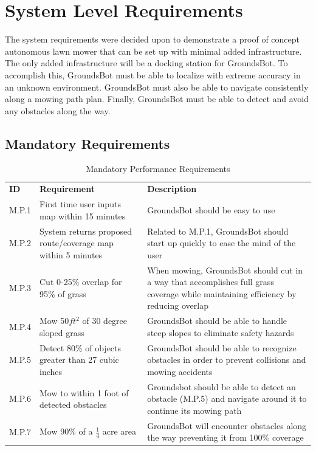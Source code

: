 \documentclass[12pt]{extarticle}
\begin{document}
\newpage
\section{System Level Requirements}

The system requirements were decided upon to demonstrate a proof of concept autonomous lawn mower that can be set up with minimal added infrastructure. The only added infrastructure will be a docking station for GroundsBot. To accomplish this, GroundsBot must be able to localize with extreme accuracy in an unknown environment. GroundsBot must also be able to navigate consistently along a mowing path plan. Finally, GroundsBot must be able to detect and avoid any obstacles along the way.

\subsection{Mandatory Requirements}
\begin{center}
  \begin{table}[H]
  \caption{Mandatory Performance Requirements}
  \label{table:mandatory performance}
  
  \vspace{1em}

  \def\arraystretch{1.5}
  	\begin{tabularx}{\textwidth}{ lXX }
  	  	\hline
		\sffamily\textbf{ID} & \sffamily\textbf{Requirement} & \sffamily\textbf{Description} \\
    	M.P.1 &
    	First time user inputs map within 15 minutes &
    	GroundsBot should be easy to use \\
   		M.P.2 &
   		System returns proposed route/coverage map within 5 minutes &
   		Related to M.P.1, GroundsBot should start up quickly to ease the mind of the user \\
   		M.P.3 &
   		Cut 0-25\% overlap for 95\% of grass &
   		When mowing, GroundsBot should cut in a way that accomplishes full grass coverage while maintaining efficiency by reducing overlap\\
		M.P.4 &
		Mow 50$ft^2$ of 30 degree sloped grass &
		GroundsBot should be able to handle steep slopes to eliminate safety hazards \\
		M.P.5 &
		Detect 80\% of objects greater than 27 cubic inches &
		GroundsBot should be able to recognize obstacles in order to prevent collisions and mowing accidents \\
		M.P.6 &
		Mow to within 1 foot of detected obstacles &
		Groundsbot should be able to detect an obstacle (M.P.5) and navigate around it to continue its mowing path \\
		M.P.7 &
		Mow 90\% of a $\frac{1}{4}$ acre area &
		GroundsBot will encounter obstacles along the way preventing it from 100\% coverage \\
	\end{tabularx}
  \end{table}
\end{center}
\end{document}
